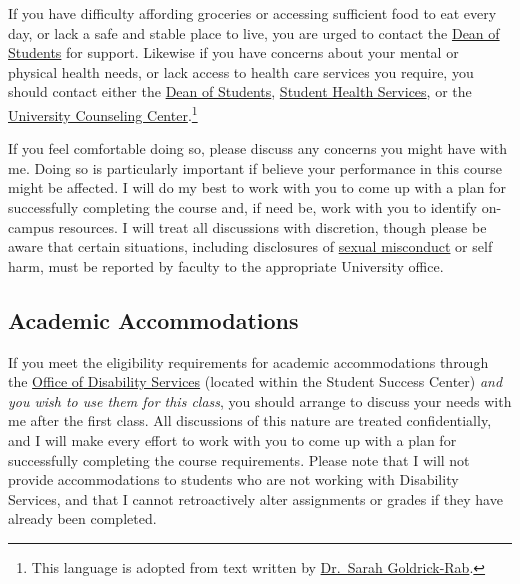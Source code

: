 \documentclass[]{book}
\let\rmarkdownfootnote\footnote%
\def\footnote{\protect\rmarkdownfootnote}
\begin{document}
If you have difficulty affording groceries or accessing sufficient food to eat every day, or lack a safe and stable place to live, you are urged to contact the \href{https://www.slu.edu/student-development/dean-of-students/index.php}{Dean of Students} for support. Likewise if you have concerns about your mental or physical health needs, or lack access to health care services you require, you should contact either the \href{https://www.slu.edu/student-development/dean-of-students/index.php}{Dean of Students}, \href{https://www.slu.edu/life-at-slu/student-health/index.php}{Student Health Services}, or the \href{https://www.slu.edu/life-at-slu/university-counseling/index.php}{University Counseling Center}.\footnote{This language is adopted from text written by \href{https://medium.com/@saragoldrickrab/basic-needs-security-and-the-syllabus-d24cc7afe8c9}{Dr.~Sarah Goldrick-Rab}.}

If you feel comfortable doing so, please discuss any concerns you might have with me. Doing so is particularly important if believe your performance in this course might be affected. I will do my best to work with you to come up with a plan for successfully completing the course and, if need be, work with you to identify on-campus resources. I will treat all discussions with discretion, though please be aware that certain situations, including disclosures of \href{/compassionate-coursework.html}{sexual misconduct} or self harm, must be reported by faculty to the appropriate University office.

\hypertarget{academic-accommodations}{%
\subsection{Academic Accommodations}\label{academic-accommodations}}

If you meet the eligibility requirements for academic accommodations through the \href{https://www.slu.edu/life-at-slu/student-success-center/disability-services/index.php}{Office of Disability Services} (located within the Student Success Center) \emph{and you wish to use them for this class}, you should arrange to discuss your needs with me after the first class. All discussions of this nature are treated confidentially, and I will make every effort to work with you to come up with a plan for successfully completing the course requirements. Please note that I will not provide accommodations to students who are not working with Disability Services, and that I cannot retroactively alter assignments or grades if they have already been completed.
\end{document}
